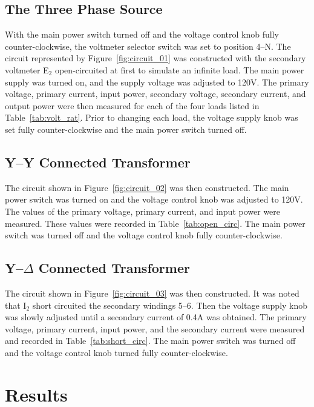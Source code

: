 \documentclass{article}
\begin{document}
\subsection{The Three Phase Source}

\label{part1} With the main power switch turned off and the voltage control
knob fully counter-clockwise, the voltmeter selector switch was set to position
4--N. The circuit represented by Figure~\ref{fig:circuit_01} was constructed
with the secondary voltmeter E$_2$ open-circuited at first to simulate an
infinite load.  The main power supply was turned on, and the supply voltage was
adjusted to 120V. The primary voltage, primary current, input power, secondary
voltage, secondary current, and output power were then measured for each of the
four loads listed in Table~\ref{tab:volt_rat}.  Prior to changing each load,
the voltage supply knob was set fully counter-clockwise and the main power
switch turned off.

\subsection{Y--Y Connected Transformer}

\label{part2} The circuit shown in Figure~\ref{fig:circuit_02} was then
constructed. The main power switch was turned on and the voltage control knob
was adjusted to 120V. The values of the primary voltage, primary current, and
input power were measured. These values were recorded in
Table~\ref{tab:open_circ}.  The main power switch was turned off and the
voltage control knob fully counter-clockwise.

\subsection{Y--$\Delta$ Connected Transformer}

\label{part3} The circuit shown in Figure~\ref{fig:circuit_03} was then
constructed. It was noted that I$_2$ short circuited the secondary windings
5--6. Then the voltage supply knob was slowly adjusted until a secondary
current of 0.4A was obtained. The primary voltage, primary current, input
power, and the secondary current were measured and recorded in
Table~\ref{tab:short_circ}.  The main power switch was turned off and the
voltage control knob turned fully counter-clockwise.

\section{Results}
\end{document}
